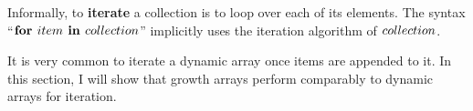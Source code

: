 Informally, to \textbf{iterate} a collection is to loop over each of its elements. The syntax ``$\textbf{for } item \textbf{ in } collection$'' implicitly uses the iteration algorithm of $collection$.

It is very common to iterate a dynamic array once items are appended to it. In this section, I will show that growth arrays perform comparably to dynamic arrays for iteration.